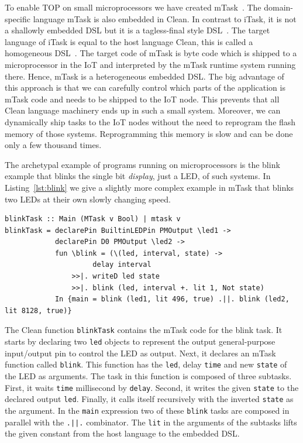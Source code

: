 \documentclass[runningheads]{llncs}
\newcommand{\CleanInline}[1]{\lstinline[language=Clean]!#1!}
\newcommand{\prog}[1]{\CleanInline{#1}}
\begin{document}
To enable TOP on small microprocessors we have created mTask~\cite{koopman_task-based_2018,lubbers20tiered}.
The domain-specific language mTask is also embedded in Clean.
In contrast to iTask, it is not a shallowly embedded DSL but it is a tagless-final style DSL~\cite{FinallyTagless}.
The target language of iTask is equal to the host language Clean, this is called a homogeneous DSL~\cite{TrattDSL}.
The target code of mTask is byte code which is shipped to a microprocessor in the IoT and interpreted by the mTask runtime system running there.
Hence, mTask is a heterogeneous embedded {DSL}.
The big advantage of this approach is that we can carefully control which parts of the application is mTask code and needs to be shipped to the IoT node.
This prevents that all Clean language machinery ends up in such a small system.
Moreover, we can dynamically ship tasks to the IoT nodes without the need to reprogram the flash memory of those systems.
Reprogramming this memory is slow and can be done only a few thousand times.

The archetypal example of programs running on microprocessors is the blink example that blinks the single bit \emph{display}, just a LED, of such systems.
In Listing~\ref{lst:blink} we give a slightly more complex example in mTask that blinks two LEDs at their own slowly changing speed.

\begin{lstlisting}[language=Clean,caption={An mTask task to blink two LEDs at their own rate.},label={lst:blink}]
blinkTask :: Main (MTask v Bool) | mtask v
blinkTask = declarePin BuiltinLEDPin PMOutput \led1 ->
            declarePin D0 PMOutput \led2 ->
            fun \blink = (\(led, interval, state) ->
                     delay interval
                >>|. writeD led state
                >>|. blink (led, interval +. lit 1, Not state)
            In {main = blink (led1, lit 496, true) .||. blink (led2, lit 8128, true)}
\end{lstlisting}

The Clean function \prog{blinkTask} contains the mTask code for the blink task.
It starts by declaring two \prog{led} objects to represent the output general-purpose input/output pin to control the LED as output.
Next, it declares an mTask function called \prog{blink}.
This function has the \prog{led}, delay \prog{time} and new \prog{state} of the LED as arguments.
The task in this function is composed of three subtasks.
First, it waits \prog{time} millisecond by \prog{delay}.
Second, it writes the given \prog{state} to the declared output \prog{led}.
Finally, it calls itself recursively with the inverted \prog{state} as the argument.
In the \prog{main} expression two of these \prog{blink} tasks are composed in parallel with the \prog{.||.} combinator.
The \prog{lit} in the arguments of the subtasks lifts the given constant from the host language to the embedded {DSL}.
\end{document}
